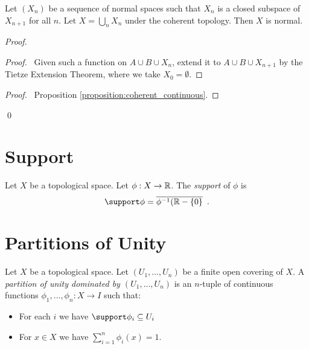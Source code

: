 \begin{proposition}[Choice]
    Let $(X_n)$ be a sequence of normal spaces such that $X_n$ is a closed subspace of $X_{n+1}$ for all $n$.
    Let $X = \bigcup_n X_n$ under the coherent topology. Then $X$ is normal.
\end{proposition}

\begin{proof}
    \pf
    \begin{proof}
        \pf\ Given such a function on $A \cup B \cup X_n$, extend it to $A \cup B \cup X_{n+1}$ by the Tietze Extension Theorem,
        where we take $X_0 = \emptyset$.
    \end{proof}
    \begin{proof}
        \pf\ Proposition \ref{proposition:coherent_continuous}.
    \end{proof}
    \qed
\end{proof}

\section{Support}

\begin{definition}[Support]
    Let $X$ be a topological space. Let $\phi : X \rightarrow \mathbb{R}$. The \emph{support} of $\phi$ is
    \[ \support \phi = \overline{\inv{\phi}(\RR - \{0\}} \enspace . \]
\end{definition}

\section{Partitions of Unity}

\begin{definition}
    Let $X$ be a topological space.
    Let $(U_1, \ldots, U_n)$ be a finite open covering of $X$. A \emph{partition of unity dominated by $(U_1, \ldots, U_n)$}
    is an $n$-tuple of continuous functions $\phi_1, \ldots, \phi_n : X \rightarrow I$ such that:
    \begin{itemize}
        \item For each $i$ we have $\support \phi_i \subseteq U_i$
        \item For $x \in X$ we have $\sum_{i=1}^n \phi_i(x) = 1$.
    \end{itemize}
\end{definition}

